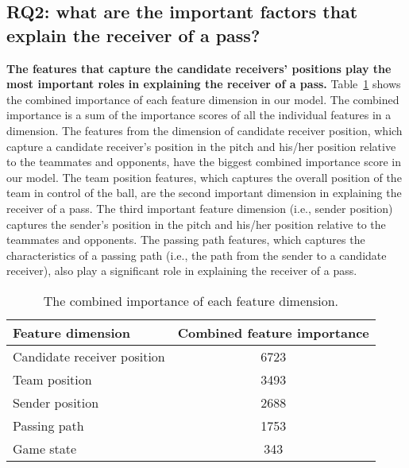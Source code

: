 \subsection{RQ2: what are the important factors that explain the receiver of a pass?}\label{RQ3-results}

\textbf{The features that capture the candidate receivers' positions play the most important roles in explaining the receiver of a pass.}
Table~\ref{tab:combined-feature-importance} shows the combined importance of each feature dimension in our model. The combined importance is a sum of the importance scores of all the individual features in a dimension.
The features from the dimension of candidate receiver position, which capture a candidate receiver's position in the pitch and his/her position relative to the teammates and opponents, have the biggest combined importance score in our model.
The team position features, which captures the overall position of the team in control of the ball, are the second important dimension in explaining the receiver of a pass.
The third important feature dimension (i.e., sender position) captures the sender's position in the pitch and his/her position relative to the teammates and opponents.
The passing path features, which captures the characteristics of a passing path (i.e., the path from the sender to a candidate receiver), also play a significant role in explaining the receiver of a pass.

\begin{table}[!t]
\caption{The combined importance of each feature dimension.}
\centering
\begin{tabular}{lc}
  \toprule
  Feature dimension & Combined feature importance \\
  \midrule
  Candidate receiver position & 6723 \\
  Team position & 3493 \\
  Sender position & 2688 \\
  Passing path & 1753 \\
  Game state & 343 \\
  \bottomrule
\end{tabular}
\label{tab:combined-feature-importance}
\end{table}

